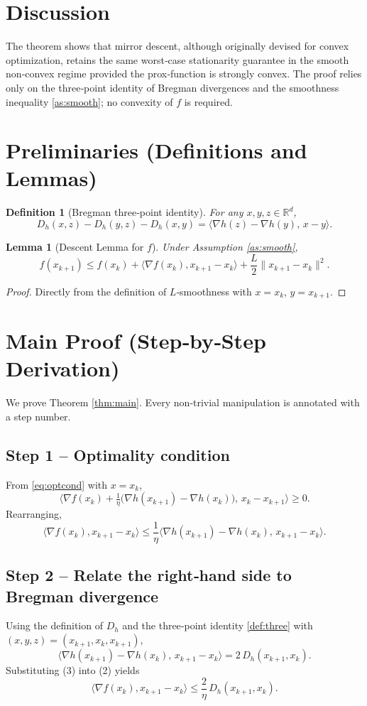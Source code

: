 \documentclass{article}
\newtheorem{lemma}{Lemma}
\newtheorem{definition}{Definition}
\newcommand{\grad}{\nabla}
\newcommand{\Breg}{D_h}
\newcommand{\R}{\mathbb{R}}
\begin{document}
\section*{Discussion}
The theorem shows that mirror descent, although originally devised for convex
optimization, retains the same worst‑case stationarity guarantee in the smooth
non‑convex regime provided the prox‑function is strongly convex. The proof
relies only on the three‑point identity of Bregman divergences and the
smoothness inequality \eqref{as:smooth}; no convexity of $f$ is required.

\newpage
\section*{Preliminaries (Definitions and Lemmas)}
\begin{definition}[Bregman three‑point identity]\label{def:three}
For any $x,y,z\in\R^{d}$,
\[
\Breg(x,z)-\Breg(y,z)-\Breg(x,y)=\langle\nabla h(z)-\nabla h(y),\,x-y\rangle .
\]
\end{definition}
\begin{lemma}[Descent Lemma for $f$]\label{lem:descent}
Under Assumption \ref{as:smooth},
\[
f(x_{k+1})\le f(x_k)+\langle \grad f(x_k),x_{k+1}-x_k\rangle+\frac{L}{2}\|x_{k+1}-x_k\|^{2}.
\]
\end{lemma}
\begin{proof}
Directly from the definition of $L$‑smoothness with $x=x_k$, $y=x_{k+1}$.
\end{proof}

\section*{Main Proof (Step‑by‑Step Derivation)}
We prove Theorem \ref{thm:main}. Every non‑trivial manipulation is annotated
with a step number.

\subsection*{Step 1 – Optimality condition}
From \eqref{eq:optcond} with $x=x_k$,
\[
\big\langle \grad f(x_k)+\tfrac{1}{\eta}\big(\nabla h(x_{k+1})-\nabla h(x_k)\big),\,
x_k-x_{k+1}\big\rangle\ge 0 .
\tag{1}
\]
Rearranging,
\[
\langle \grad f(x_k),x_{k+1}-x_k\rangle
\le
\frac{1}{\eta}\big\langle \nabla h(x_{k+1})-\nabla h(x_k),\,x_{k+1}-x_k\big\rangle .
\tag{2}
\]

\subsection*{Step 2 – Relate the right‑hand side to Bregman divergence}
Using the definition of $\Breg$ and the three‑point identity
\eqref{def:three} with $(x,y,z)=(x_{k+1},x_k,x_{k+1})$,
\[
\langle \nabla h(x_{k+1})-\nabla h(x_k),\,x_{k+1}-x_k\rangle
=2\,\Breg(x_{k+1},x_k) .
\tag{3}
\]
Substituting (3) into (2) yields
\[
\langle \grad f(x_k),x_{k+1}-x_k\rangle
\le
\frac{2}{\eta}\,\Breg(x_{k+1},x_k).
\tag{4}
\]
\end{document}
